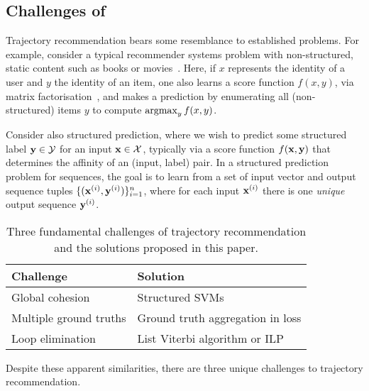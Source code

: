 \subsection{Challenges of {\trajrec}}

Trajectory recommendation bears some resemblance to established problems. %
For example, 
consider a typical recommender systems problem
with non-structured, {static} content such as books or movies~\citep{Goldberg:1992,Sarwar:2001,Netflix}.
Here, if $x$ represents the identity of a user and $y$ the identity of an item,
one also learns a score function $f( x, y )$, \eg via matrix factorisation~\citep{Koren:2009},
and makes a prediction by enumerating all ({non-structured}) items $y$ to compute $\operatorname*{argmax}_y f(x,y)$.

Consider also structured prediction,
where we wish to predict some structured label $\mathbf{y} \in \mathcal{Y}$ for an input $\mathbf{x} \in \mathcal{X}$,
typically via a score function $f(\mathbf{x},\mathbf{y})$ that determines the affinity of an (input, label) pair.
In a structured prediction problem for sequences, the goal is to learn from a set of input vector and output sequence tuples
$\{ (\mathbf{x}^{({i})}, \mathbf{y}^{({i})}) \}_{i = 1}^n$, where
for each input $\mathbf{x}^{({i})}$ there is one \emph{unique} output sequence $\mathbf{y}^{({i})}$.


\begin{table}[t]
	\centering
	\begin{tabular}{ll}
	\hline
	\hline
	{\bf Challenge}                    & {\bf Solution}                             \\ \hline
	Global cohesion                    & Structured SVMs                            \\ \hline
	Multiple ground truths             & Ground truth aggregation in loss 			\\ \hline
	Loop elimination                   & List Viterbi algorithm or ILP              \\ \hline
	\end{tabular}
	\caption{Three fundamental challenges of trajectory recommendation and the solutions proposed in this paper.}
	\label{tbl:challenges}
\end{table}

Despite these apparent similarities,
there are three unique challenges to trajectory recommendation.


